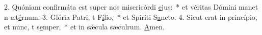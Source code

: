 2. Quóniam confirmáta est super nos misericórdi \uline{e}jus:~* et véritas Dómini manet n æt\uline{é}rnum.
3. Glória Patri, t F\uline{í}lio,~* et Spiríti S\uline{a}ncto.
4. Sicut erat in princípio, et nunc, t s\uline{e}mper,~* et in sǽcula sæculrum. \uline{A}men.
